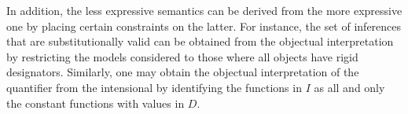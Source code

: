 \documentclass[]{article}
\begin{document}
In addition, the less expressive semantics can be derived from the more expressive one by placing certain constraints on the latter. For instance, the set of inferences that are substitutionally valid can be obtained from the objectual interpretation by restricting the models considered to those where all objects have rigid designators. Similarly, one may obtain the objectual interpretation of the quantifier from the intensional by identifying the functions in $I$ as all and only the constant functions with values in $D$.
\end{document}
